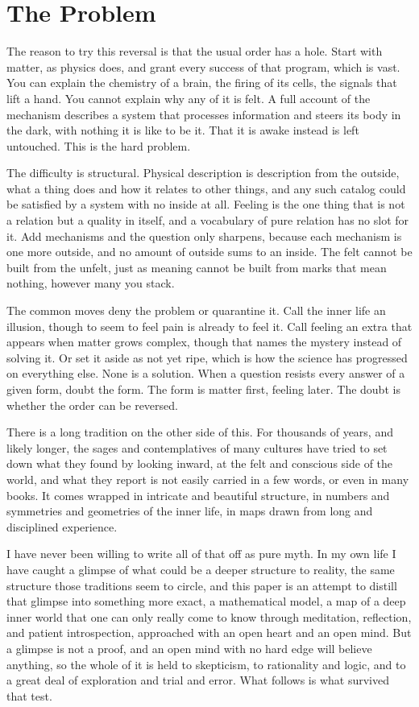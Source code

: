 \section{The Problem}

The reason to try this reversal is that the usual order has a hole. Start with matter, as physics does, and grant every success of that program, which is vast. You can explain the chemistry of a brain, the firing of its cells, the signals that lift a hand. You cannot explain why any of it is felt. A full account of the mechanism describes a system that processes information and steers its body in the dark, with nothing it is like to be it. That it is awake instead is left untouched. This is the hard problem.

The difficulty is structural. Physical description is description from the outside, what a thing does and how it relates to other things, and any such catalog could be satisfied by a system with no inside at all. Feeling is the one thing that is not a relation but a quality in itself, and a vocabulary of pure relation has no slot for it. Add mechanisms and the question only sharpens, because each mechanism is one more outside, and no amount of outside sums to an inside. The felt cannot be built from the unfelt, just as meaning cannot be built from marks that mean nothing, however many you stack.

The common moves deny the problem or quarantine it. Call the inner life an illusion, though to seem to feel pain is already to feel it. Call feeling an extra that appears when matter grows complex, though that names the mystery instead of solving it. Or set it aside as not yet ripe, which is how the science has progressed on everything else. None is a solution. When a question resists every answer of a given form, doubt the form. The form is matter first, feeling later. The doubt is whether the order can be reversed.

There is a long tradition on the other side of this. For thousands of years, and likely longer, the sages and contemplatives of many cultures have tried to set down what they found by looking inward, at the felt and conscious side of the world, and what they report is not easily carried in a few words, or even in many books. It comes wrapped in intricate and beautiful structure, in numbers and symmetries and geometries of the inner life, in maps drawn from long and disciplined experience.

I have never been willing to write all of that off as pure myth. In my own life I have caught a glimpse of what could be a deeper structure to reality, the same structure those traditions seem to circle, and this paper is an attempt to distill that glimpse into something more exact, a mathematical model, a map of a deep inner world that one can only really come to know through meditation, reflection, and patient introspection, approached with an open heart and an open mind. But a glimpse is not a proof, and an open mind with no hard edge will believe anything, so the whole of it is held to skepticism, to rationality and logic, and to a great deal of exploration and trial and error. What follows is what survived that test.

